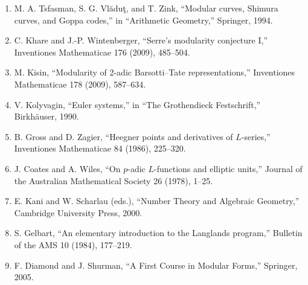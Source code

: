 \begin{enumerate}
\item M. A. Tsfasman, S. G. Vl\u{a}du\c{t}, and T. Zink, ``Modular curves, Shimura curves, and Goppa codes,'' in ``Arithmetic Geometry,'' Springer, 1994.
\item C. Khare and J.-P. Wintenberger, ``Serre's modularity conjecture I,'' Inventiones Mathematicae 176 (2009), 485--504.
\item M. Kisin, ``Modularity of 2-adic Barsotti--Tate representations,'' Inventiones Mathematicae 178 (2009), 587--634.
\item V. Kolyvagin, ``Euler systems,'' in ``The Grothendieck Festschrift,'' Birkh\"auser, 1990.
\item B. Gross and D. Zagier, ``Heegner points and derivatives of $L$-series,'' Inventiones Mathematicae 84 (1986), 225--320.
\item J. Coates and A. Wiles, ``On $p$-adic $L$-functions and elliptic units,'' Journal of the Australian Mathematical Society 26 (1978), 1--25.
\item E. Kani and W. Scharlau (eds.), ``Number Theory and Algebraic Geometry,'' Cambridge University Press, 2000.
\item S. Gelbart, ``An elementary introduction to the Langlands program,'' Bulletin of the AMS 10 (1984), 177--219.
\item F. Diamond and J. Shurman, ``A First Course in Modular Forms,'' Springer, 2005.
\end{enumerate}

